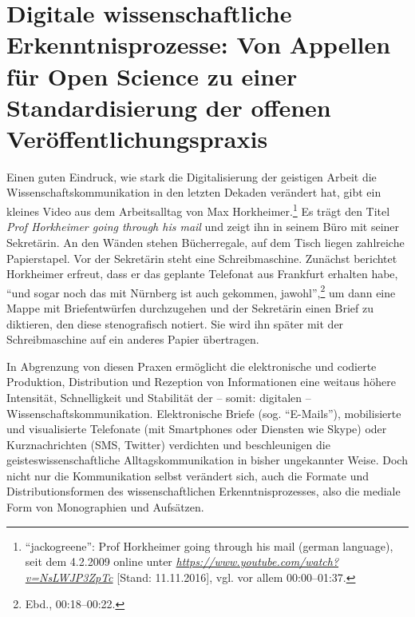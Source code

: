 \documentclass[a4paper,
fontsize=11pt,
oneside,
numbers=noperiodatend,
parskip=half-,
bibliography=totoc,
final
]{scrartcl}
\begin{document}
\section*{Digitale wissenschaftliche Erkenntnisprozesse: Von
Appellen für Open Science zu einer Standardisierung der offenen
Veröffentlichungspraxis}\label{digitale-wissenschaftliche-erkenntnisprozesse-von-appellen-fuxfcr-open-science-zu-einer-standardisierung-der-offenen-veruxf6ffentlichungspraxis}

Einen guten Eindruck, wie stark die Digitalisierung der geistigen Arbeit
die Wissenschaftskommunikation in den letzten Dekaden verändert hat,
gibt ein kleines Video aus dem Arbeitsalltag von Max
Horkheimer.\footnote{\enquote{jackogreene}: Prof Horkheimer going
  through his mail (german language), seit dem 4.2.2009 online unter
  \href{https://www.youtube.com/watch?v=NsLWJP3ZpTc}{\emph{https://www.youtube.com/watch?v=NsLWJP3ZpTc}}
  {[}Stand: 11.11.2016{]}, vgl. vor allem 00:00--01:37.} Es trägt den
Titel \emph{Prof Horkheimer going through his mail} und zeigt ihn in
seinem Büro mit seiner Sekretärin. An den Wänden stehen Bücherregale,
auf dem Tisch liegen zahlreiche Papierstapel. Vor der Sekretärin steht
eine Schreibmaschine. Zunächst berichtet Horkheimer erfreut, dass er das
geplante Telefonat aus Frankfurt erhalten habe, \enquote{und sogar noch
das mit Nürnberg ist auch gekommen, jawohl},\footnote{Ebd.,
  00:18--00:22.} um dann eine Mappe mit Briefentwürfen durchzugehen und
der Sekretärin einen Brief zu diktieren, den diese stenografisch
notiert. Sie wird ihn später mit der Schreibmaschine auf ein anderes
Papier übertragen.

In Abgrenzung von diesen Praxen ermöglicht die elektronische und
codierte Produktion, Distribution und Rezeption von Informationen eine
weitaus höhere Intensität, Schnelligkeit und Stabilität der -- somit:
digitalen -- Wissenschaftskommunikation. Elektronische Briefe (sog.
\enquote{E-Mails}), mobilisierte und visualisierte Telefonate (mit
Smartphones oder Diensten wie Skype) oder Kurznachrichten (SMS, Twitter)
verdichten und beschleunigen die geisteswissenschaftliche
Alltagskommunikation in bisher ungekannter Weise. Doch nicht nur die
Kommunikation selbst verändert sich, auch die Formate und
Distributionsformen des wissenschaftlichen Erkenntnisprozesses, also die
mediale Form von Monographien und Aufsätzen.
\end{document}
